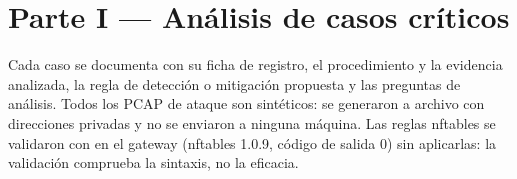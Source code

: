 \chapter{Parte I — Análisis de casos críticos}\label{cap:parte1}
Cada caso se documenta con su ficha de registro, el procedimiento y la evidencia analizada, la regla de detección o mitigación propuesta y las preguntas de análisis. Todos los PCAP de ataque son sintéticos: se generaron a archivo con direcciones privadas y no se enviaron a ninguna máquina. Las reglas nftables se validaron con  en el gateway (nftables 1.0.9, código de salida 0) sin aplicarlas: la validación comprueba la sintaxis, no la eficacia.



